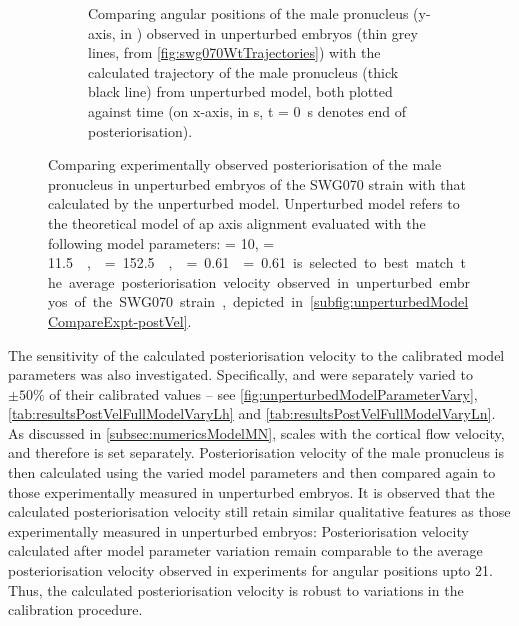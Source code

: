 \begin{figure}
\begin{subfigure}[t]{0.45\textwidth}
        \caption{Comparing angular positions of the male pronucleus (y-axis, in \si{\unitAngle}) observed in unperturbed embryos (thin grey lines, from \autoref{fig:swg070WtTrajectories}) with the calculated trajectory of the male pronucleus (thick black line) from unperturbed model, both plotted against time (on x-axis, in \si{\second}, t = \SI{0}{\second} denotes end of posteriorisation).}
        \label{subfig:unperturbedModelCompareExpt-tracks}
    \end{subfigure}
    \caption[Experimentally observed posteriorisation in unperturbed embryos compared with that calculated by theoretical model]{Comparing experimentally observed posteriorisation of the male pronucleus in unperturbed embryos of the SWG070 strain with that calculated by the unperturbed model. Unperturbed model refers to the theoretical model of \ac{ap} axis alignment evaluated with the following model parameters: \hydrodynamicLength = \SI{10}{\unitLength}, \activeRelaxLength = \SI{11.5}{\square\unitLength\per\second}, \nematicLength = \SI{152.5}{\square\unitLength\per\second}, \dragCoefficient = \num{0.61}. \dragCoefficient = \num{0.61} is selected to best match the average posteriorisation velocity observed in unperturbed embryos of the SWG070 strain, depicted in \autoref{subfig:unperturbedModelCompareExpt-postVel}.}
    \label{fig:unperturbedModelCompareExpt}
\end{figure} 

The sensitivity of the calculated posteriorisation velocity to the calibrated model parameters was also investigated. Specifically, \hydrodynamicLength and \nematicLength were separately varied to $\pm\num{50}\%$ of their calibrated values -- see \autoref{fig:unperturbedModelParameterVary}, \autoref{tab:resultsPostVelFullModelVaryLh} and \autoref{tab:resultsPostVelFullModelVaryLn}. As discussed in \autoref{subsec:numericsModelMN}, \activeRelaxLength scales with the cortical flow velocity, and therefore is set separately. Posteriorisation velocity of the male pronucleus is then calculated using the varied model parameters and then compared again to those experimentally measured in unperturbed embryos. It is observed that the calculated posteriorisation velocity still retain similar qualitative features as those experimentally measured in unperturbed embryos: Posteriorisation velocity calculated after model parameter variation remain comparable to the average posteriorisation velocity observed in experiments for angular positions upto \SI{21}{\unitAngle}. Thus, the calculated posteriorisation velocity is robust to variations in the calibration procedure.

